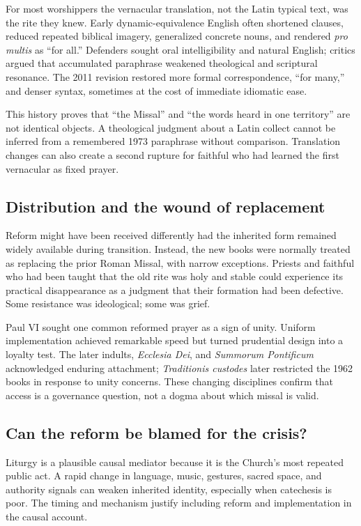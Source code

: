 For most worshippers the vernacular translation, not the Latin typical text, was the rite they knew. Early dynamic-equivalence English often shortened clauses, reduced repeated biblical imagery, generalized concrete nouns, and rendered \emph{pro multis} as “for all.” Defenders sought oral intelligibility and natural English; critics argued that accumulated paraphrase weakened theological and scriptural resonance. The 2011 revision restored more formal correspondence, “for many,” and denser syntax, sometimes at the cost of immediate idiomatic ease.

This history proves that “the Missal” and “the words heard in one territory” are not identical objects. A theological judgment about a Latin collect cannot be inferred from a remembered 1973 paraphrase without comparison. Translation changes can also create a second rupture for faithful who had learned the first vernacular as fixed prayer.

\subsection{Distribution and the wound of replacement}

Reform might have been received differently had the inherited form remained widely available during transition. Instead, the new books were normally treated as replacing the prior Roman Missal, with narrow exceptions. Priests and faithful who had been taught that the old rite was holy and stable could experience its practical disappearance as a judgment that their formation had been defective. Some resistance was ideological; some was grief.

Paul VI sought one common reformed prayer as a sign of unity. Uniform implementation achieved remarkable speed but turned prudential design into a loyalty test. The later indults, \emph{Ecclesia Dei}, and \emph{Summorum Pontificum} acknowledged enduring attachment; \emph{Traditionis custodes} later restricted the 1962 books in response to unity concerns. These changing disciplines confirm that access is a governance question, not a dogma about which missal is valid.

\subsection{Can the reform be blamed for the crisis?}

Liturgy is a plausible causal mediator because it is the Church's most repeated public act. A rapid change in language, music, gestures, sacred space, and authority signals can weaken inherited identity, especially when catechesis is poor. The timing and mechanism justify including reform and implementation in the causal account.

